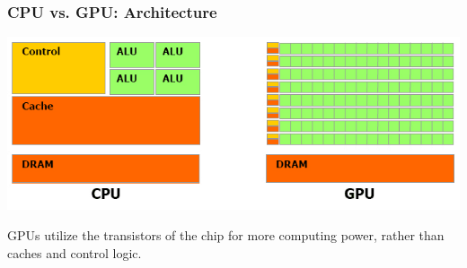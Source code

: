 \documentclass{beamer}
\begin{document}
\begin{frame}[fragile]
\frametitle{CPU vs. GPU: Architecture}
\includegraphics[width=\textwidth]{graphics/gpu}

GPUs utilize the transistors of the chip for more computing power,
rather than caches and control logic.

\end{frame}


\newcommand{\twolinebeginparen}{\left(\begin{array}{c} \\ \\ \end{array}\right.}
\newcommand{\twolineendparen}{\left.\begin{array}{c} \\ \\ \end{array}\right)}
\end{document}
